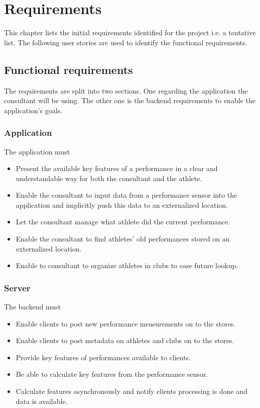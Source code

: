 \chapter{Requirements}
This chapter lists the initial requirements identified for the project i.e. a tentative list. The following user stories are used to identify the functional requirements.


\section*{Functional requirements}
The requirements are split into two sections. One regarding the application the consultant will be using. The other one is the backend requirements to enable the application's goals.

\subsection*{Application}
The application must
\begin{itemize}
	\item Present the available key features of a performance in a clear and understandable way for both the consultant and the athlete.
	\item Enable the consultant to input data from a performance sensor into the application and implicitly push this data to an externalized location.
	\item Let the consultant manage what athlete did the current performance.
	\item Enable the consultant to find athletes' old performances stored on an externalized location.
	\item Enable to consultant to organize athletes in clubs to ease future lookup.
\end{itemize}

\subsection*{Server}
The backend must
\begin{itemize}
	\item Enable clients to post new performance measurements on to the stores.
	\item Enable clients to post metadata on athletes and clubs on to the stores.
	\item Provide key features of performances available to clients.
	\item Be able to calculate key features from the performance sensor.
	\item Calculate features asynchronously and notify clients processing is done and data is available.
\end{itemize}

